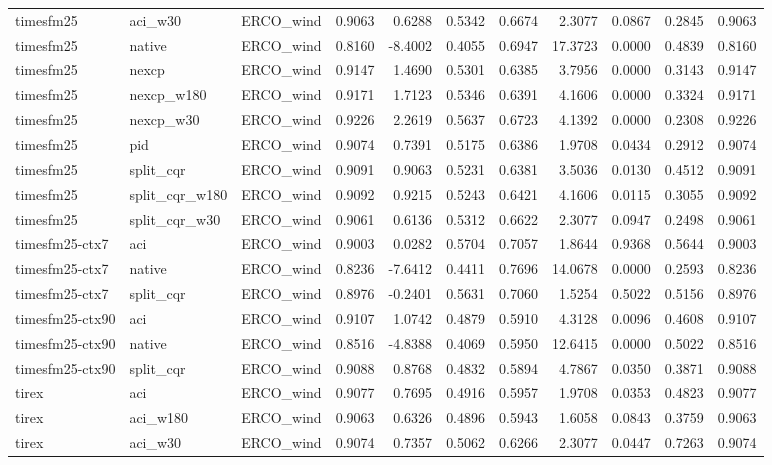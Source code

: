 \begin{tabular}{lllrrrrrrrr}
timesfm25 & aci_w30 & ERCO_wind & 0.9063 & 0.6288 & 0.5342 & 0.6674 & 2.3077 & 0.0867 & 0.2845 & 0.9063 \\
timesfm25 & native & ERCO_wind & 0.8160 & -8.4002 & 0.4055 & 0.6947 & 17.3723 & 0.0000 & 0.4839 & 0.8160 \\
timesfm25 & nexcp & ERCO_wind & 0.9147 & 1.4690 & 0.5301 & 0.6385 & 3.7956 & 0.0000 & 0.3143 & 0.9147 \\
timesfm25 & nexcp_w180 & ERCO_wind & 0.9171 & 1.7123 & 0.5346 & 0.6391 & 4.1606 & 0.0000 & 0.3324 & 0.9171 \\
timesfm25 & nexcp_w30 & ERCO_wind & 0.9226 & 2.2619 & 0.5637 & 0.6723 & 4.1392 & 0.0000 & 0.2308 & 0.9226 \\
timesfm25 & pid & ERCO_wind & 0.9074 & 0.7391 & 0.5175 & 0.6386 & 1.9708 & 0.0434 & 0.2912 & 0.9074 \\
timesfm25 & split_cqr & ERCO_wind & 0.9091 & 0.9063 & 0.5231 & 0.6381 & 3.5036 & 0.0130 & 0.4512 & 0.9091 \\
timesfm25 & split_cqr_w180 & ERCO_wind & 0.9092 & 0.9215 & 0.5243 & 0.6421 & 4.1606 & 0.0115 & 0.3055 & 0.9092 \\
timesfm25 & split_cqr_w30 & ERCO_wind & 0.9061 & 0.6136 & 0.5312 & 0.6622 & 2.3077 & 0.0947 & 0.2498 & 0.9061 \\
timesfm25-ctx7 & aci & ERCO_wind & 0.9003 & 0.0282 & 0.5704 & 0.7057 & 1.8644 & 0.9368 & 0.5644 & 0.9003 \\
timesfm25-ctx7 & native & ERCO_wind & 0.8236 & -7.6412 & 0.4411 & 0.7696 & 14.0678 & 0.0000 & 0.2593 & 0.8236 \\
timesfm25-ctx7 & split_cqr & ERCO_wind & 0.8976 & -0.2401 & 0.5631 & 0.7060 & 1.5254 & 0.5022 & 0.5156 & 0.8976 \\
timesfm25-ctx90 & aci & ERCO_wind & 0.9107 & 1.0742 & 0.4879 & 0.5910 & 4.3128 & 0.0096 & 0.4608 & 0.9107 \\
timesfm25-ctx90 & native & ERCO_wind & 0.8516 & -4.8388 & 0.4069 & 0.5950 & 12.6415 & 0.0000 & 0.5022 & 0.8516 \\
timesfm25-ctx90 & split_cqr & ERCO_wind & 0.9088 & 0.8768 & 0.4832 & 0.5894 & 4.7867 & 0.0350 & 0.3871 & 0.9088 \\
tirex & aci & ERCO_wind & 0.9077 & 0.7695 & 0.4916 & 0.5957 & 1.9708 & 0.0353 & 0.4823 & 0.9077 \\
tirex & aci_w180 & ERCO_wind & 0.9063 & 0.6326 & 0.4896 & 0.5943 & 1.6058 & 0.0843 & 0.3759 & 0.9063 \\
tirex & aci_w30 & ERCO_wind & 0.9074 & 0.7357 & 0.5062 & 0.6266 & 2.3077 & 0.0447 & 0.7263 & 0.9074 \\

\end{tabular}
